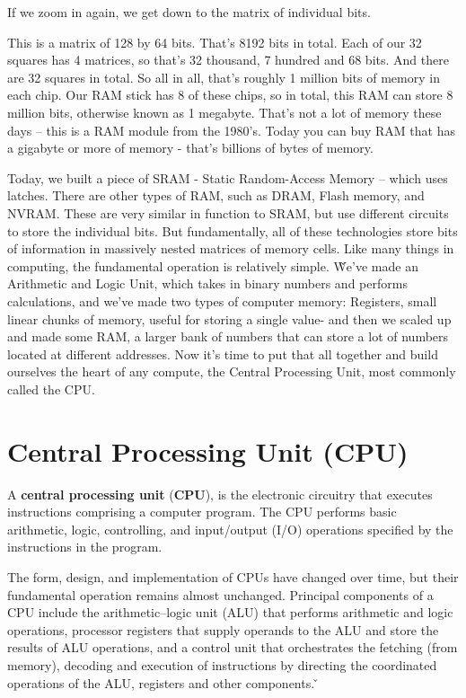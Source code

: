 
If we zoom in again, we get down to the matrix of individual bits.


This is a matrix of 128 by 64 bits. That's 8192 bits in total. Each of our 32 squares has 4 matrices, so that's 32
thousand, 7 hundred and 68 bits. And there are 32 squares in total. So all in all, that's roughly 1 million bits of
memory in each chip. Our RAM stick has 8 of these chips, so in total, this RAM can store 8 million bits, otherwise
known as 1 megabyte. That's not a lot of memory these days -- this is a RAM module from the 1980's. Today you can buy
RAM that has a gigabyte or more of memory - that's billions of bytes of memory.
\ee

Today, we built a piece of SRAM - Static Random-Access Memory – which uses latches. There are other types of RAM,
such as DRAM, Flash memory, and NVRAM. These are very similar in function to SRAM, but use different circuits to
store the individual bits. But fundamentally, all of these technologies store bits of information in massively nested
matrices of memory cells. Like many things in computing, the fundamental operation is relatively simple. \v

We've made an Arithmetic and Logic Unit, which takes in binary numbers and performs calculations, and we've made two
types of computer memory: Registers, small linear chunks of memory, useful for storing a single value- and then we
scaled up and made some RAM, a larger bank of numbers that can store a lot of numbers located at different addresses.
Now it's time to put that all together and build ourselves the heart of any compute, the Central Processing Unit,
most commonly called the CPU\@.

\section{Central Processing Unit (CPU)}

A \textbf{central processing unit} (\textbf{CPU}), is the electronic circuitry that executes instructions comprising
a computer program. The CPU performs basic arithmetic, logic, controlling, and input/output (I/O) operations
specified by the instructions in the program.
\ed


The form, design, and implementation of CPUs have changed over time, but their fundamental operation remains almost
unchanged. Principal components of a CPU include the arithmetic–logic unit (ALU) that performs arithmetic and logic
operations, processor registers that supply operands to the ALU and store the results of ALU operations, and a
control unit that orchestrates the fetching (from memory), decoding and execution of instructions by directing the
coordinated operations of the ALU, registers and other components. \v

